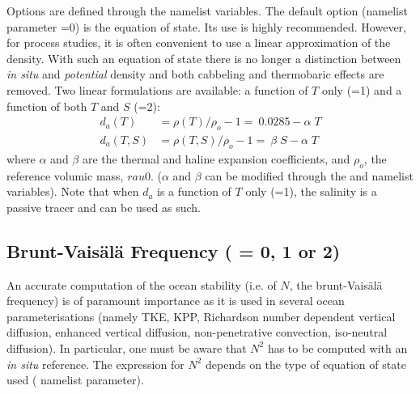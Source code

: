 Options are defined through the   namelist variables.
The default option (namelist parameter =0) is the \citet{JackMcD1995} 
equation of state. Its use is highly recommended. However, for process studies, 
it is often convenient to use a linear approximation of the density.
With such an equation of state there is no longer a distinction between 
\textit{in situ} and \textit{potential} density and both cabbeling and thermobaric
effects are removed.
Two linear formulations are available: a function of $T$ only (=1) 
and a function of both $T$ and $S$ (=2):
\begin{equation} \label{Eq_tra_eos_linear}
\begin{split}
  d_a(T)       &=  \rho (T)      /  \rho_o   - 1     =  \  0.0285         -  \alpha   \;T     \\ 
  d_a(T,S)    &=  \rho (T,S)   /  \rho_o   - 1     =  \  \beta \; S       -  \alpha   \;T    
\end{split}
\end{equation} 
where $\alpha$ and $\beta$ are the thermal and haline expansion 
coefficients, and $\rho_o$, the reference volumic mass, $rau0$. 
($\alpha$ and $\beta$ can be modified through the  and 
 namelist variables). Note that when $d_a$ is a function 
of $T$ only (=1), the salinity is a passive tracer and can be 
used as such.

\subsection{Brunt-Vais\"{a}l\"{a} Frequency ( = 0, 1 or 2)}
\label{TRA_bn2}

An accurate computation of the ocean stability (i.e. of $N$, the brunt-Vais\"{a}l\"{a}
 frequency) is of paramount importance as it is used in several ocean 
 parameterisations (namely TKE, KPP, Richardson number dependent 
 vertical diffusion, enhanced vertical diffusion, non-penetrative convection, 
 iso-neutral diffusion). In particular, one must be aware that $N^2$ has to 
 be computed with an \textit{in situ} reference. The expression for $N^2$ 
 depends on the type of equation of state used ( namelist parameter).

